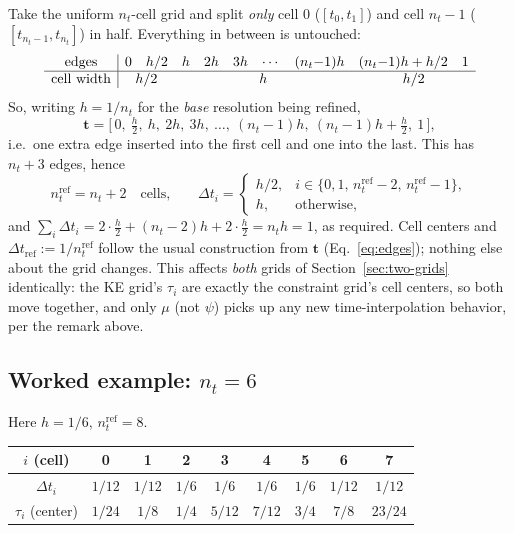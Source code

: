 \documentclass[11pt]{article}
\newcommand{\dt}{\Delta t}
\newcommand{\h}{h}
\begin{document}
Take the uniform $n_t$-cell grid and split \emph{only} cell $0$ ($[t_0,t_1]$) and cell
$n_t-1$ ($[t_{n_t-1}, t_{n_t}]$) in half. Everything in between is untouched:
\[
\begin{array}{c|ccccccccc}
\text{edges} & 0 & \h/2 & \h & 2\h & 3\h & \cdots & (n_t{-}1)\h & (n_t{-}1)\h + \h/2 & 1 \\
\hline
\text{cell width} & \multicolumn{2}{c}{\h/2} & \multicolumn{5}{c}{\h} & \multicolumn{2}{c}{\h/2}
\end{array}
\]
So, writing $\h = 1/n_t$ for the \emph{base} resolution being refined,
\begin{equation}
  \label{eq:edges}
  \mathbf{t} = \bigl[\,0,\ \tfrac{\h}{2},\ \h,\ 2\h,\ 3\h,\ \ldots,\ (n_t{-}1)\h,\
  (n_t{-}1)\h + \tfrac{\h}{2},\ 1\,\bigr],
\end{equation}
i.e.\ one extra edge inserted into the first cell and one into the last. This has
$n_t+3$ edges, hence
\begin{equation}
  n_t^{\mathrm{ref}} = n_t + 2 \quad \text{cells,} \qquad
  \Delta t_i =
  \begin{cases}
    \h/2, & i \in \{0,1,\,n_t^{\mathrm{ref}}{-}2,\, n_t^{\mathrm{ref}}{-}1\}, \\
    \h,   & \text{otherwise,}
  \end{cases}
\end{equation}
and $\sum_i \Delta t_i = 2\cdot\tfrac{\h}{2} + (n_t-2)\h + 2\cdot\tfrac{\h}{2} = n_t \h = 1$,
as required. Cell centers and $\dt_{\mathrm{ref}} := 1/n_t^{\mathrm{ref}}$ follow the usual
construction from $\mathbf{t}$ (Eq.~\ref{eq:edges}); nothing else about the grid changes.
This affects \emph{both} grids of Section~\ref{sec:two-grids} identically: the KE grid's
$\tau_i$ are exactly the constraint grid's cell centers, so both move together, and only
$\mu$ (not $\psi$) picks up any new time-interpolation behavior, per the remark above.

\subsection{Worked example: $n_t = 6$}
\label{sec:worked}

Here $\h = 1/6$, $n_t^{\mathrm{ref}} = 8$.

\begin{center}
\begin{tabular}{c|cccccccc}
\toprule
$i$ (cell) & 0 & 1 & 2 & 3 & 4 & 5 & 6 & 7 \\
\midrule
$\Delta t_i$ & $1/12$ & $1/12$ & $1/6$ & $1/6$ & $1/6$ & $1/6$ & $1/12$ & $1/12$ \\
$\tau_i$ (center) & $1/24$ & $1/8$ & $1/4$ & $5/12$ & $7/12$ & $3/4$ & $7/8$ & $23/24$ \\
\bottomrule
\end{tabular}
\end{center}
\end{document}
